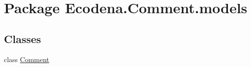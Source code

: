 \hypertarget{namespace_ecodena_1_1_comment_1_1models}{
\section{Package Ecodena.Comment.models}
\label{d6/d07/namespace_ecodena_1_1_comment_1_1models}
}
\subsection*{Classes}
\begin{DoxyCompactItemize}
\item 
class \hyperlink{class_ecodena_1_1_comment_1_1models_1_1_comment}{Comment}
\end{DoxyCompactItemize}

